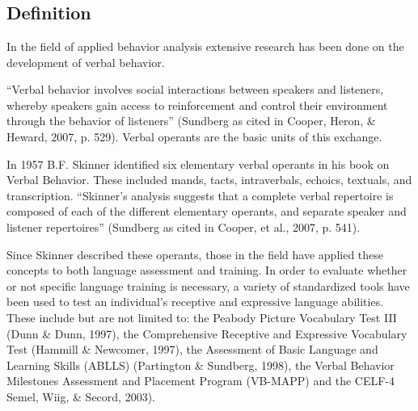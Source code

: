 \section[\fourdNine{}]{\fourdNine{}%
              }
\subsection{Definition}
In the field of applied behavior analysis extensive research has been done on the development of verbal behavior.  

``Verbal behavior involves social interactions between speakers and listeners, whereby speakers gain access to reinforcement and control their environment through the behavior of listeners'' (Sundberg as cited in Cooper, Heron, \& Heward, 2007, p. 529). Verbal operants are the basic units of this exchange.  

In 1957 B.F. Skinner identified six elementary verbal operants in his book on Verbal Behavior.  These included mands, tacts, intraverbals, echoics, textuals, and transcription.  ``Skinner's analysis suggests that a complete verbal repertoire is composed of each of the different elementary operants, and separate speaker and listener repertoires'' (Sundberg as cited in Cooper, et al., 2007, p. 541).   

Since Skinner described these operants, those in the field have applied these concepts to both language assessment and training.  In order to evaluate whether or not specific language training is necessary, a variety of standardized tools have been used to test an individual's receptive and expressive language abilities.  These include but are not limited to: the Peabody Picture Vocabulary Test III (Dunn \& Dunn, 1997), the Comprehensive Receptive and Expressive Vocabulary Test (Hammill \& Newcomer, 1997), the Assessment of Basic Language and Learning Skills (ABLLS) (Partington \& Sundberg, 1998), the Verbal Behavior Milestones Assessment and Placement Program (VB-MAPP) and the CELF-4 Semel, Wiig, \& Secord, 2003).  

